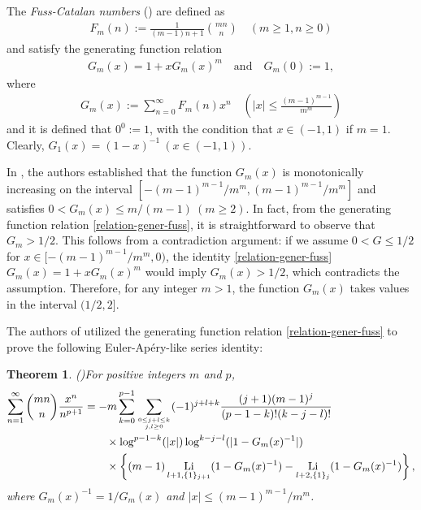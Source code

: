 \documentclass[11pt]{article}
\DeclareMathOperator{\Li}{Li}
\theoremstyle{plain}
\newtheorem{thm}{Theorem}[section]
\theoremstyle{definition}
\begin{document}
The \emph{Fuss-Catalan numbers} (\cite{Av2008, SR2005, HP2001}) are defined as
\begin{align*}
F_m(n):=\frac{1}{(m-1)n+1}\binom{mn}{n} \quad (m\geq 1,n\geq 0)
\end{align*}
and satisfy the generating function relation \cite[(2.9)]{HP2001}
\begin{align}\label{relation-gener-fuss}
G_m(x)=1+xG_m(x)^m\quad\text{and}\quad G_m(0):=1,
\end{align}
where
\begin{align*}
G_m(x):=\sum_{n=0}^\infty F_m(n)x^n\quad \left(|x|\leq \frac{(m-1)^{m-1}}{m^m}\right)
\end{align*}
and it is defined that $0^0:=1$, with the condition that $x\in(-1,1)$ if $m=1$. Clearly, $G_1(x)=(1-x)^{-1}\ (x\in(-1,1))$.

In \cite[Section 2.2]{WLX2022}, the authors established that the function $G_m(x)$ is monotonically increasing on the interval $[-(m-1)^{m-1}/{m^m},(m-1)^{m-1}/{m^m}]$ and satisfies $0<G_m(x)\leq m/(m-1)\ (m\geq 2)$. In fact, from the generating function relation \eqref{relation-gener-fuss}, it is straightforward to observe that $G_m>1/2$.  This follows from a contradiction argument: if we assume $0<G\leq 1/2$ for $x\in [-(m-1)^{m-1}/{m^m},0)$, the identity \eqref{relation-gener-fuss} $G_m(x)=1+xG_m(x)^m$ would imply $G_m(x)>1/2$, which contradicts the assumption. Therefore, for any integer $m>1$, the function $G_m(x)$ takes values in the interval $(1/2,2]$.

The authors of \cite{WLX2022} utilized the generating function relation \eqref{relation-gener-fuss} to prove the following Euler-Ap\'ery-like series identity:
\begin{thm}(\cite[Theorem 3.8]{WLX2022})\label{thm-Bfc} For positive integers $m$ and $p$,
\begin{align}\label{FSN3}
\sum_{n=1}^\infty \binom{mn}{n}\frac{x^n}{n^{p+1}}&=-m\sum_{k=0}^{p-1} \sum_{0\leq j+l\leq k\atop j,l\geq 0}  (-1)^{j+l+k} \frac{(j+1)(m-1)^j}{(p-1-k)!(k-j-l)!}\nonumber\\&\quad\quad\times \log^{p-1-k}(|x|)\log^{k-j-l}(|1-G_m(x)^{-1}|)\nonumber\\&\quad\quad\times \left\{(m-1)\Li_{l+1,\{1\}_{j+1}}(1-G_m(x)^{-1})-\Li_{l+2,\{1\}_{j}} (1-G_m(x)^{-1}) \right\},
\end{align}
where $G_m(x)^{-1}=1/G_m(x)$ and $|x|\leq(m-1)^{m-1}/m^m$.
\end{thm}
\end{document}
